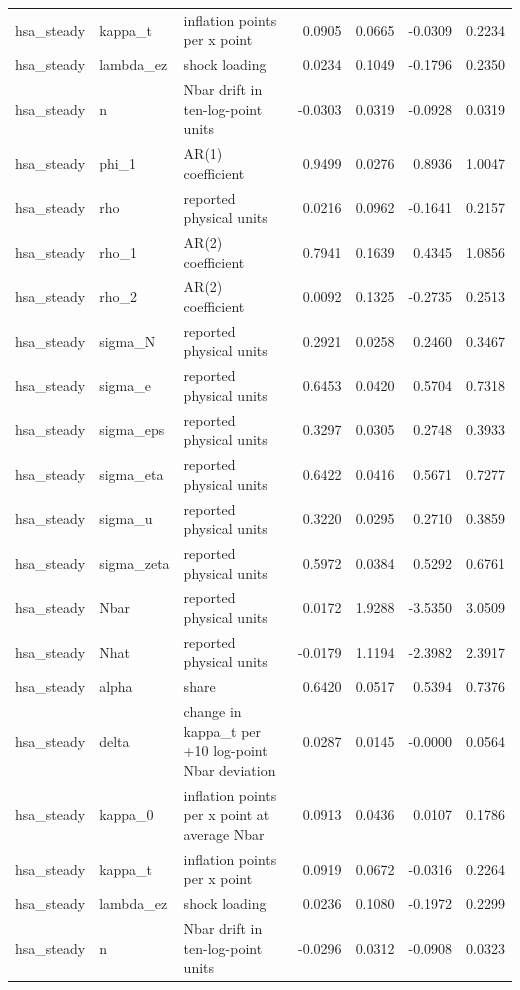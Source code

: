 \begin{tabular}{lllrrrr}
hsa\_steady & kappa\_t & inflation points per x point & 0.0905 & 0.0665 & -0.0309 & 0.2234 \\
hsa\_steady & lambda\_ez & shock loading & 0.0234 & 0.1049 & -0.1796 & 0.2350 \\
hsa\_steady & n & Nbar drift in ten-log-point units & -0.0303 & 0.0319 & -0.0928 & 0.0319 \\
hsa\_steady & phi\_1 & AR(1) coefficient & 0.9499 & 0.0276 & 0.8936 & 1.0047 \\
hsa\_steady & rho & reported physical units & 0.0216 & 0.0962 & -0.1641 & 0.2157 \\
hsa\_steady & rho\_1 & AR(2) coefficient & 0.7941 & 0.1639 & 0.4345 & 1.0856 \\
hsa\_steady & rho\_2 & AR(2) coefficient & 0.0092 & 0.1325 & -0.2735 & 0.2513 \\
hsa\_steady & sigma\_N & reported physical units & 0.2921 & 0.0258 & 0.2460 & 0.3467 \\
hsa\_steady & sigma\_e & reported physical units & 0.6453 & 0.0420 & 0.5704 & 0.7318 \\
hsa\_steady & sigma\_eps & reported physical units & 0.3297 & 0.0305 & 0.2748 & 0.3933 \\
hsa\_steady & sigma\_eta & reported physical units & 0.6422 & 0.0416 & 0.5671 & 0.7277 \\
hsa\_steady & sigma\_u & reported physical units & 0.3220 & 0.0295 & 0.2710 & 0.3859 \\
hsa\_steady & sigma\_zeta & reported physical units & 0.5972 & 0.0384 & 0.5292 & 0.6761 \\
hsa\_steady & Nbar & reported physical units & 0.0172 & 1.9288 & -3.5350 & 3.0509 \\
hsa\_steady & Nhat & reported physical units & -0.0179 & 1.1194 & -2.3982 & 2.3917 \\
hsa\_steady & alpha & share & 0.6420 & 0.0517 & 0.5394 & 0.7376 \\
hsa\_steady & delta & change in kappa\_t per +10 log-point Nbar deviation & 0.0287 & 0.0145 & -0.0000 & 0.0564 \\
hsa\_steady & kappa\_0 & inflation points per x point at average Nbar & 0.0913 & 0.0436 & 0.0107 & 0.1786 \\
hsa\_steady & kappa\_t & inflation points per x point & 0.0919 & 0.0672 & -0.0316 & 0.2264 \\
hsa\_steady & lambda\_ez & shock loading & 0.0236 & 0.1080 & -0.1972 & 0.2299 \\
hsa\_steady & n & Nbar drift in ten-log-point units & -0.0296 & 0.0312 & -0.0908 & 0.0323 \\

\end{tabular}
